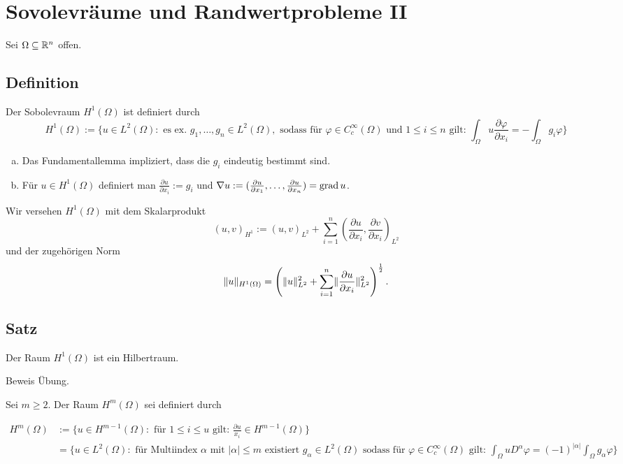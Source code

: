 \section{Sovolevräume und Randwertprobleme II}

Sei $\Omega \subseteq \mathbb{R}^n$ offen.

\subsection{Definition}

Der Sobolevraum $H^1(\Omega)$ ist definiert durch\\
$$
H^1(\Omega) := \{u \in L^2(\Omega) \colon \text{ es ex. } g_1, \dots, g_n \in L^2(\Omega), \text{ sodass für } \varphi \in C_c^\infty(\Omega) \text{ und } 1 \leq i \leq n \text{ gilt: } \int_\Omega u \frac{\partial \varphi}{\partial x_i} = - \int_\Omega g_i \varphi \}
$$

\begin{bem}
  \begin{enumerate}[a)]
  \item Das Fundamentallemma impliziert, dass die $g_i$ eindeutig bestimmt sind.
  \item Für $u \in H^1(\Omega)$ definiert man $\frac{\partial u}{\partial x_i} := g_i$ und $\nabla u := ( \frac{\partial u}{\partial x_1}, \dots, \frac{\partial u}{\partial x_n}) = \operatorname{grad} u$.
\end{enumerate}
\end{bem}

Wir versehen $H^1(\Omega)$ mit dem Skalarprodukt
$$
(u,v)_{H^1} := (u,v)_{L^2} + \sum_{i = 1}^n (\frac{\partial u}{\partial x_i}, \frac{\partial v}{\partial x_i})_{L^2}
$$
und der zugehörigen Norm
$$
\lVert u \rVert_{H^1(\Omega)} = \left(\lVert u \rVert_{L^2}^2 + \sum_{i = 1}^n \lVert \frac{\partial u}{\partial x_i} \rVert_{L^2}^2 \right)^{\frac{1}{2}}.
$$

\subsection{Satz}

Der Raum $H^1(\Omega)$ ist ein Hilbertraum.

Beweis Übung.

Sei $m \geq 2$. Der Raum $H^m(\Omega)$ sei definiert durch

\begin{align*}
H^m(\Omega) 
&:=  \{ u \in H^{m - 1}(\Omega) \colon \text{ für } 1 \leq i \leq u \text{ gilt: } \frac{\partial u}{x_i} \in H^{m-1}(\Omega) \} \\
& = \{u \in L^2(\Omega) \colon \text{ für Multiindex } \alpha \text{ mit } |\alpha| \leq m \text{ existiert } g_\alpha \in L^2(\Omega) \text{ sodass für } \varphi \in C_c^\infty(\Omega) \text{ gilt: } \int_\Omega u D^\alpha \varphi = (-1)^{|\alpha|} \int_\Omega g_\alpha \varphi \}
\end{align*}

